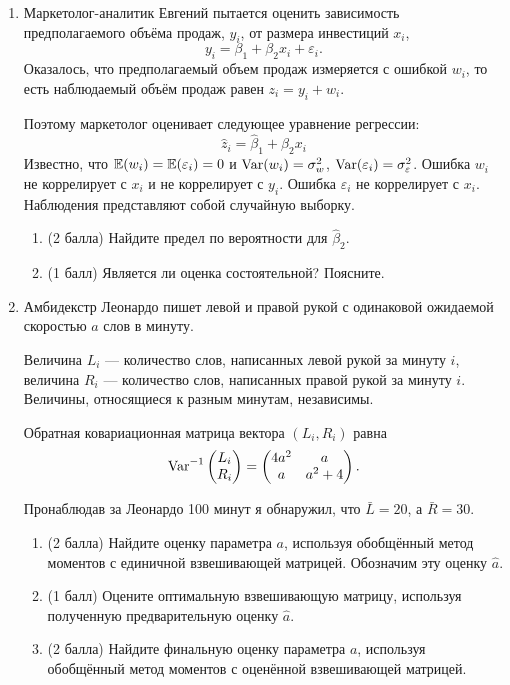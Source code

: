 \begin{enumerate}
    \item Маркетолог-аналитик Евгений пытается оценить зависимость предполагаемого объёма продаж, $y_i$, от размера инвестиций $x_i$,
\[    
y_i = \beta_1 + \beta_2 x_i + \varepsilon_i.
\]
Оказалось, что предполагаемый объем продаж измеряется с ошибкой $w_i$, то есть наблюдаемый объём продаж равен $z_i = y_i + w_i$.   

Поэтому маркетолог оценивает следующее уравнение регрессии:
\[ 
\hat z_i = \hat\beta_1 + \hat\beta_2 x_i
\]
Известно, что $\operatorname{\mathbb{E}}(w_i)=\operatorname{\mathbb{E}}(\varepsilon_i)=0$ и $\operatorname{Var}(w_i)=\sigma^2_w$, $\operatorname{Var}(\varepsilon_i)=\sigma^2_\varepsilon$. 
Ошибка $w_i$ не коррелирует с $x_i$ и не коррелирует с $y_i$. Ошибка $\varepsilon_i$ не коррелирует с $x_i$.
Наблюдения представляют собой случайную выборку.

\begin{enumerate}
    \item (2 балла) Найдите предел по вероятности для $\hat{\beta}_2$. 
    \item (1 балл) Является ли оценка состоятельной? Поясните.
\end{enumerate}


\item Амбидекстр Леонардо пишет левой и правой рукой с одинаковой ожидаемой скоростью $a$ слов в минуту. 
    
    Величина $L_i$ — количество слов, написанных левой рукой за минуту $i$, 
    величина $R_i$ — количество слов, написанных правой рукой за минуту $i$. 
    Величины, относящиеся к разным минутам, независимы. 
    
    Обратная ковариационная матрица вектора $(L_i, R_i)$ равна
    \[
        \operatorname{Var}^{-1} \begin{pmatrix}
        L_i \\
        R_i \\
        \end{pmatrix} = 
        \begin{pmatrix}
        4a^2 & a \\
        a & a^2+4 \\
        \end{pmatrix}.
    \]
    
    Пронаблюдав за Леонардо 100 минут я обнаружил, что $\bar L = 20$, а $\bar R = 30$.
    
    \begin{enumerate}
        \item (2 балла) Найдите оценку параметра $a$, используя обобщённый метод моментов с единичной взвешивающей матрицей. Обозначим эту оценку $\hat a$. %
        \item (1 балл) Оцените оптимальную взвешивающую матрицу, используя полученную предварительную оценку $\hat a$. %
        \item (2 балла) Найдите финальную оценку параметра $a$, используя обобщённый метод моментов с оценённой взвешивающей матрицей. %
        

\end{enumerate}
\end{enumerate}
